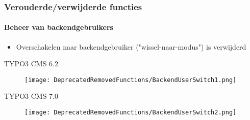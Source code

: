 
\begin{frame}[fragile]
	\frametitle{Verouderde/verwijderde functies}
	\framesubtitle{Beheer van backendgebruikers}

	\begin{itemize}
		\item Overschakelen naar backendgebruiker ("wissel-naar-modus") is verwijderd
	\end{itemize}

	\smaller\tabto{1cm}\begingroup\color{typo3red}TYPO3 CMS 6.2\endgroup\normalsize
	\begin{figure}\vspace{-0.4cm}
		\texttt{[image: DeprecatedRemovedFunctions/BackendUserSwitch1.png]}
	\end{figure}

	\smaller\tabto{1cm}\begingroup\color{typo3red}TYPO3 CMS 7.0\endgroup\normalsize
	\begin{figure}\vspace{-0.4cm}
		\texttt{[image: DeprecatedRemovedFunctions/BackendUserSwitch2.png]}
	\end{figure}

\end{frame}


